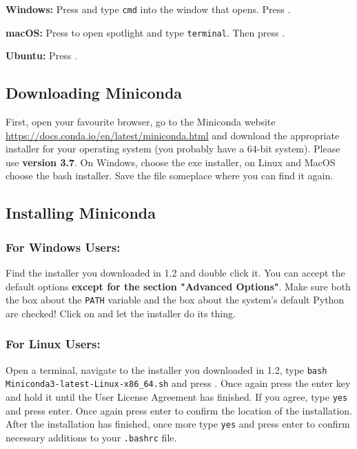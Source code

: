 \vspace{1em}

\textbf{Windows:} Press  and type \texttt{cmd} into the window that opens. Press \keys{\return}.

\vspace{1em}

\noindent \textbf{macOS:} Press \keys{\cmdmac + \Space} to open spotlight and type \texttt{terminal}. Then press \keys{\return}.

\vspace{1em}

\noindent \textbf{Ubuntu:} Press .

\vspace{1em}

\subsection{Downloading Miniconda}

First, open your favourite browser, go to the Miniconda website \url{https://docs.conda.io/en/latest/miniconda.html} and download the appropriate installer for your operating system (you probably have a 64-bit system). Please use \textbf{version 3.7}. On Windows, choose the exe installer, on Linux and MacOS choose the bash installer. Save the file someplace where you can find it again.

\subsection{Installing Miniconda}

\subsubsection*{For Windows Users:}

Find the installer you downloaded in 1.2 and double click it. You can accept the default options \textbf{except for the section "Advanced Options"}. Make sure both the box about the \texttt{PATH} variable and the box about the system's default Python are checked! Click on  and let the installer do its thing.

\subsubsection*{For Linux Users:}

Open a terminal, navigate to the installer you downloaded in 1.2, type \texttt{bash Miniconda3-latest-Linux-x86\_64.sh} and press \keys{\return}. Once again press the enter key and hold it until the User License Agreement has finished. If you agree, type \texttt{yes} and press enter. Once again press enter to confirm the location of the installation. After the installation has finished, once more type \texttt{yes} and press enter to confirm necessary additions to your \texttt{.bashrc} file.


